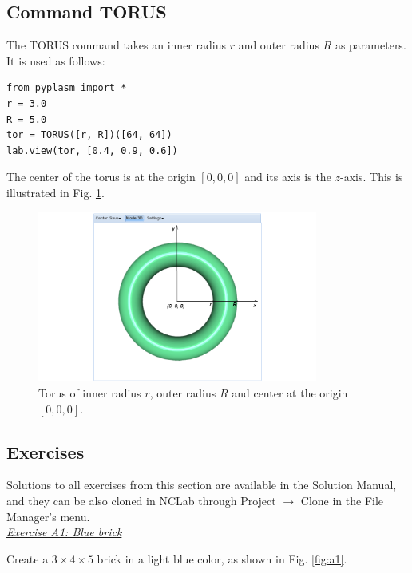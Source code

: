\documentclass[article,A4,12pt]{llncs}
\begin{document}
\subsection{Command TORUS}

The TORUS command takes an inner radius $r$ and outer radius 
$R$ as parameters. It is used as follows:
\begin{verbatim}
from pyplasm import *
r = 3.0
R = 5.0
tor = TORUS([r, R])([64, 64])
lab.view(tor, [0.4, 0.9, 0.6])
\end{verbatim}
The center of the torus is at the origin $[0, 0, 0]$ and its axis
is the $z$-axis. This is illustrated in Fig. \ref{fig:torus-1}.

\newpage

\begin{figure}[!ht]
\begin{center}
\includegraphics[width=0.82\textwidth]{img/torus-1.png}
\end{center}
\vspace{-2mm}
\caption{Torus of inner radius $r$, outer radius $R$ and center at the origin $[0, 0, 0]$.}
\label{fig:torus-1}
\end{figure}



\subsection{Exercises}

Solutions to all exercises from this section are available in the Solution Manual, and 
they can be also cloned in NCLab through Project $\rightarrow$ Clone in the 
File Manager's menu.\\

\noindent
\underline{\em Exercise A1: Blue brick}

Create a $3 \times 4 \times 5$ brick in a light
blue color, as shown in Fig. \ref{fig:a1}.
\end{document}

